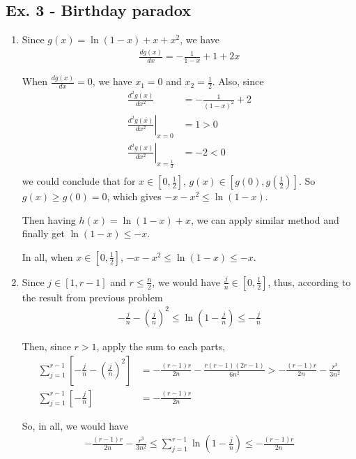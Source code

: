 \documentclass[11pt,a4paper]{article}
\begin{document}
\subsection*{Ex. 3 - Birthday paradox}
\begin{enumerate}
\item Since $g(x) = \ln(1-x) + x + x^{2}$, we have
	\begin{align*}
	\frac{d g(x)}{d x} = -\frac{1}{1-x} + 1 + 2x
	\end{align*}
\par When $\frac{dg(x)}{dx} = 0$, we have $x_{1} = 0$ and $x_{2} = \frac{1}{2}$. Also, since
	\begin{align*}
	\frac{d^{2} g(x)}{d x^{2}} &= -\frac{1}{(1-x)^{2}} + 2 \\
	\left.\frac{d^{2} g(x)}{d x^{2}}\right\vert_{x = 0} &= 1 > 0 \\
	\left.\frac{d^{2} g(x)}{d x^{2}}\right\vert_{x = \frac{1}{2}} &= -2 < 0 \\
	\end{align*}
we could conclude that for $x \in \left[0, \frac{1}{2}\right]$, $g(x) \in \left[g(0), g\left(\frac{1}{2}\right)\right]$. So $g(x) \geq g(0) = 0$, which gives $-x-x^{2} \leq \ln(1-x)$.
\par Then having $h(x) = \ln(1-x) + x$, we can apply similar method and finally get $\ln(1-x) \leq -x$.
\par In all, when $x \in \left[0, \frac{1}{2}\right]$, $-x-x^{2} \leq \ln(1-x) \leq -x$.

\item Since $j \in [1, r-1]$ and $r \leq \frac{n}{2}$, we would have $\frac{j}{n} \in \left[0, \frac{1}{2}\right]$, thus, according to the result from previous problem
	\begin{align*}
	-\frac{j}{n} - \left(\frac{j}{n}\right)^{2} \leq \ln(1 - \frac{j}{n}) \leq -\frac{j}{n}
	\end{align*}
\par Then, since $r > 1$, apply the sum to each parts,
	\begin{align*}
	\sum_{j=1}^{r-1}\left[-\frac{j}{n} - \left(\frac{j}{n}\right)^{2}\right] &= -\frac{(r-1)r}{2n} - \frac{r(r-1)(2r-1)}{6n^{2}} > -\frac{(r-1)r}{2n} - \frac{r^{3}}{3n^{2}} \\
	\sum_{j=1}^{r-1}\left[-\frac{j}{n}\right] &= -\frac{(r-1)r}{2n}
	\end{align*}
\par So, in all, we would have
	\begin{align*}
	-\frac{(r-1)r}{2n} - \frac{r^{3}}{3n^{2}} \leq \sum_{j=1}^{r-1}\ln\left(1-\frac{j}{n}\right) \leq -\frac{(r-1)r}{2n}
	\end{align*}


\end{enumerate}
\end{document}
